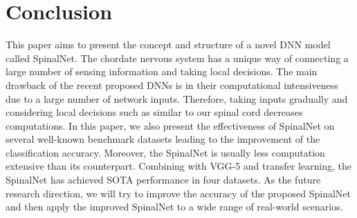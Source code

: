 \documentclass[journal]{IEEEtran}
\begin{document}
\section{Conclusion}
This paper aims to present the concept and structure of a novel DNN model called SpinalNet. The chordate nervous system has a unique way of connecting a large number of sensing information and taking local decisions. The main drawback of the recent proposed DNNs is in their computational intensiveness due to a large number of network inputs. Therefore, taking inputs gradually and considering local decisions such as similar to our spinal cord decreases computations. In this paper, we also present the effectiveness of SpinalNet on several well-known benchmark datasets leading to the improvement of the classification accuracy. Moreover, the SpinalNet is usually less computation extensive than its counterpart. Combining with VGG-5 and transfer learning, the SpinalNet has achieved SOTA performance in four datasets. As the future research direction, we will try to improve the accuracy of the proposed SpinalNet and then apply the improved SpinalNet to a wide range of real-world scenarios.



\end{document}
